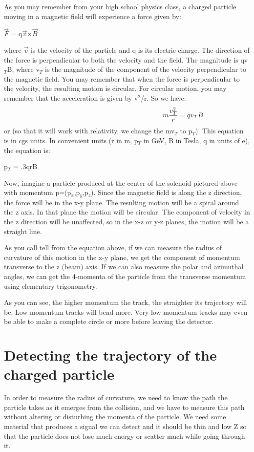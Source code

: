As you may remember from your high school physics class, a charged particle moving in a magnetic field will experience a force given by:
\begin{center}$\vec{F}$ = q$\vec{v}$$\times$$\vec{B}$ \end{center}
 where $\vec{v}$ is the velocity of the particle and q is its electric charge. The direction of the force is perpendicular to both the velocity and the field. The magnitude is qv$_{T}$B, where v$_{T}$ is the magnitude of the component of the velocity perpendicular to the magnetic field. You may remember that when the force is perpendicular to the velocity, the resulting motion is circular.  For circular motion, you may remember that the acceleration is given by v$^{2}$/r. So we have:
\begin {equation*} \hspace {58 mm}
m\dfrac{v_{T}^{2}}{r} = qv_{T}B
\end{equation*}
or (so that it will work with relativity, we change the mv$_{T}$ to p$_{T}$). This equation is in cgs units. In convenient units (r in m, p$_{T}$ in GeV, B in Tesla, q in units of e), the equation is:
\begin{center} p$_{T}$ = .3qrB \end{center}
Now, imagine a particle produced at the center of the solenoid pictured above with momentum p=(p$_{x}$,p$_{y}$,p$_{z}$). Since the magnetic field is along the z direction, the force will be in the x-y plane. The resulting motion will be a spiral around the z axis. In that plane the motion will be circular.  The component of velocity in the z direction will be unaffected, so in the x-z or y-z planes, the motion will be a straight line.

As you call tell from the equation above, if we can measure the radius of curvature of this motion in the x-y plane, we get the component of momentum transverse to the z (beam) axis.  If we can also measure the polar and azimuthal angles, we can get the 4-momenta of the particle from the transverse momentum using elementary trigonometry.

As you can see, the higher momentum the track, the straighter its trajectory will be.  Low momentum tracks will bend more.  Very low momentum tracks may even be able to make a complete circle or more before leaving the detector. 

\section{Detecting the trajectory of the charged particle}
In order to measure the radius of curvature, we need to know the path the particle takes as it emerges from the collision, and we have to measure this path without altering or disturbing the momenta of the particle.  We need some material that produces a signal we can detect and it should be thin and low Z so that the particle does not lose much energy or scatter much while going through it. 
 
